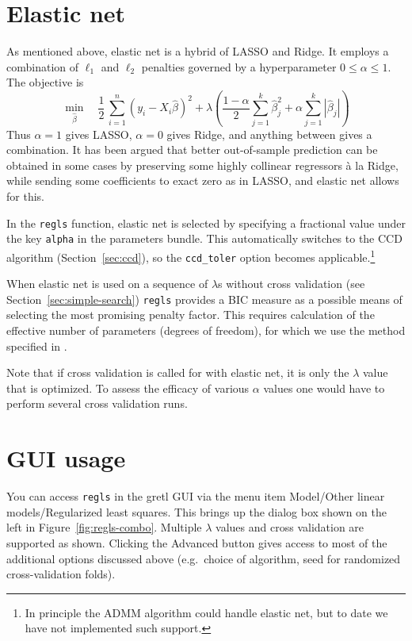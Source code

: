 \documentclass{article}
\begin{document}
\section{Elastic net}
\label{sec:elnet}

As mentioned above, elastic net is a hybrid of LASSO and Ridge. It
employs a combination of $\ell_1$ and $\ell_2$ penalties governed by a
hyperparameter $0 \leq \alpha \leq 1$. The objective is
\[
    \min_{\hat{\beta}} \quad \frac{1}{2}\,
    \sum_{i=1}^n (y_i - X_i\hat{\beta})^2 +
    \lambda \left(\frac{1-\alpha}{2} \sum_{j=1}^k \hat{\beta}_j^2
      + \alpha \sum_{j=1}^k |\hat{\beta}_j|\right)
  \]
Thus $\alpha = 1$ gives LASSO, $\alpha = 0$ gives Ridge, and anything
between gives a combination. It has been argued that better
out-of-sample prediction can be obtained in some cases by preserving
some highly collinear regressors \`a la Ridge, while sending some
coefficients to exact zero as in LASSO, and elastic net allows for
this.

In the \texttt{regls} function, elastic net is selected by specifying
a fractional value under the key \texttt{alpha} in the parameters
bundle. This automatically switches to the CCD algorithm
(Section~\ref{sec:ccd}), so the \texttt{ccd\_toler} option becomes
applicable.\footnote{In principle the ADMM algorithm could handle
  elastic net, but to date we have not implemented such support.}

When elastic net is used on a sequence of $\lambda$s without cross
validation (see Section~\ref{sec:simple-search}) \texttt{regls}
provides a BIC measure as a possible means of selecting the most
promising penalty factor. This requires calculation of the effective
number of parameters (degrees of freedom), for which we use the method
specified in \cite{zou-hastie05}.

Note that if cross validation is called for with elastic net, it is
only the $\lambda$ value that is optimized. To assess the efficacy of
various $\alpha$ values one would have to perform several cross
validation runs.

\section{GUI usage}

You can access \texttt{regls} in the gretl GUI via the menu item
\textsf{Model/Other linear models/Regularized least squares}. This
brings up the dialog box shown on the left in
Figure~\ref{fig:regls-combo}. Multiple $\lambda$ values and cross
validation are supported as shown. Clicking the \textsf{Advanced}
button gives access to most of the additional options discussed above
(e.g.\ choice of algorithm, seed for randomized cross-validation
folds).
\end{document}
